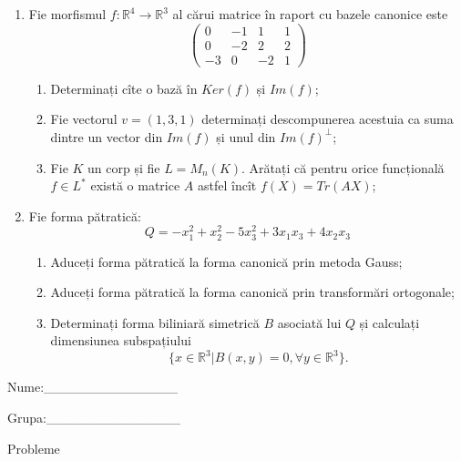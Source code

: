 \documentclass{article}
\begin{document}
\begin{enumerate}
 \item Fie morfismul $f:\mathbb{R}^4 \to \mathbb{R}^3$ al cărui matrice în raport cu bazele canonice este
$$\begin{pmatrix}
0&-1&1&1\\
0&-2&2&2\\
-3&0&-2&1
\end{pmatrix}$$

\begin{enumerate}
\item Determinați cîte o bază în $Ker(f)$ și $Im(f)$;
\item Fie vectorul $v=(1,3,1)$ determinați descompunerea acestuia ca suma dintre un vector din $Im(f)$ și unul din $Im(f)^\perp$;
\item Fie $K$ un corp și fie $L=M_n(K)$. Arătați că pentru orice funcțională $f \in L^*$ există o matrice $A$ astfel încît $f(X)=Tr(AX)$;
\end{enumerate}
\item Fie forma pătratică:
$$Q= -x_1^2+x_2^2-5x_3^2+3x_1x_3+4x_2x_3$$

\begin{enumerate}
\item Aduceți forma pătratică la forma canonică prin metoda Gauss;
\item Aduceți forma pătratică la forma canonică prin transformări ortogonale;
\item Determinați forma biliniară simetrică $B$ asociată lui $Q$ și calculați dimensiunea subspațiului
$$\{x \in \mathbb{R}^3 | B(x,y)=0,\forall y \in \mathbb{R}^3\}.$$

\end{enumerate}
\end{enumerate}
\newpage
\begin{flushright}
Nume:\_\_\_\_\_\_\_\_\_\_\_\_\_\_
 
 
Grupa:\_\_\_\_\_\_\_\_\_\_\_\_\_\_
\end{flushright}
\begin{center}
\vspace{2cm}
{\Large Probleme}
\vspace{2cm}
\end{center}
\end{document}
